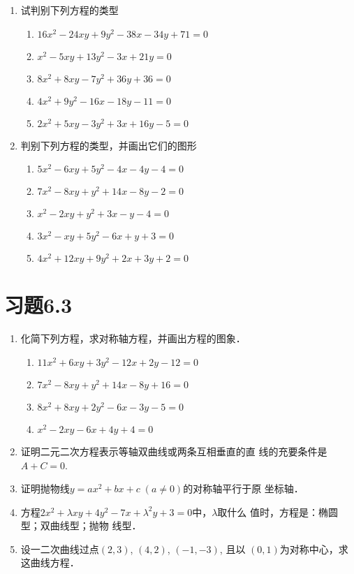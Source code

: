 \begin{ex}
\begin{enumerate}
    \item 试判别下列方程的类型
\begin{enumerate}
\item $16x^2-24xy+9y^2-38x-34y+71=0$
\item $x^2-5xy+13y^2-3x+21y=0$
\item $8x^2+8xy-7y^2+36y+36=0$
\item $4x^2+9y^2-16x-18y-11=0$
\item $2x^2+5xy-3y^2+3x+16y-5=0$
\end{enumerate}

    \item 判别下列方程的类型，并画出它们的图形
\begin{enumerate}
\item $5x^2-6xy+5y^2-4x-4y-4=0$
\item $7x^2-8xy+y^2+14x-8y-2=0$
\item $x^2-2xy+y^2+3x-y-4=0$
\item $3x^2-xy+5y^2-6x+y+3=0$
\item $4x^2+12xy+9y^2+2x+3y+2=0$   
\end{enumerate}

\end{enumerate}    
\end{ex}

\section*{习题6.3}

\begin{enumerate}
    \item 化简下列方程，求对称轴方程，并画出方程的图象．
\begin{enumerate}
    \item $11x^2+6xy+3y^2-12x+2y-12=0$
    \item $7x^2-8xy+y^2+14x-8y+16=0$
    \item $8x^2+8xy+2y^2-6x-3y-5=0$
    \item $x^2-2xy-6x+4y+4=0$
\end{enumerate}

\item 证明二元二次方程表示等轴双曲线或两条互相垂直的直
线的充要条件是$A+C=0$.
\item 证明抛物线$y=ax^2+bx+c\; (a\ne 0)$的对称轴平行于原
坐标轴．
\item 方程$2x^2+\lambda xy+4y^2-7x+\lambda^2y+3=0$中，$\lambda$取什么
值时，方程是：椭圆型；双曲线型；抛物
线型．
\item 设一二次曲线过点$(2,3)$, $(4,2)$, $(-1,-3)$, 且以
$(0,1)$为对称中心，求这曲线方程．
\end{enumerate}

